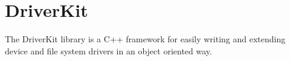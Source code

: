 
\chapter{DriverKit}

The DriverKit library is a C++ framework for easily writing and extending device and file system drivers in
an object oriented way.